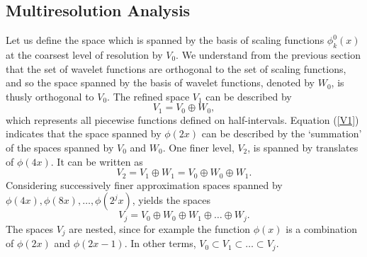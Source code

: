 \documentclass[11pt]{article}
\begin{document}
\subsection{Multiresolution Analysis}
Let us define the space which is spanned by the basis of scaling functions $\phi_{k}^{0}(x)$ at the coarsest
level of resolution by $V_0$. We understand from the previous section that the set of wavelet functions are orthogonal 
to the set of scaling functions, and so the space spanned by the basis of wavelet functions, denoted by $W_0$, is thusly
orthogonal to $V_0$. The refined space $V_1$ can be described by
\begin{equation}
V_1 = V_0 \oplus W_0,
\label{V1}
\end{equation}
which represents all piecewise functions defined on half-intervals. Equation (\ref{V1}) indicates that the space spanned by 
$\phi(2x)$ can be described by the `summation' of the spaces spanned by
$V_0$ and $W_0$. One finer level, $V_2$, is spanned by translates of $\phi(4x)$. It can be written as
\begin{equation}
V_2 = V_1 \oplus W_1 = V_0 \oplus W_0 \oplus W_1.
\label{V2}
\end{equation}
Considering successively finer approximation spaces spanned by $\phi(4x), \phi(8x), \dots, \phi(2^j x)$, yields the spaces
\begin{equation}
V_j = V_0 \oplus W_0 \oplus W_1 \oplus \dots \oplus W_j.
\end{equation}
The spaces $V_j$ are nested, since for example the function $\phi(x)$ is a combination of $\phi(2x)$ and $\phi(2x-1)$. 
In other terms, $V_0 \subset V_1 \subset \dots \subset V_j$.
\end{document}

